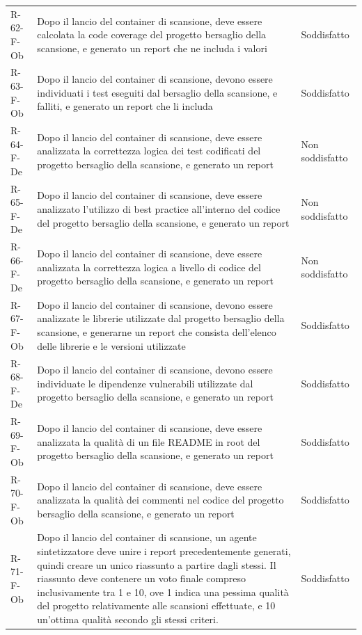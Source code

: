 \documentclass[a4paper, 11pt]{article}
\begin{document}
\begin{longtable}[c]{ >{\centering\arraybackslash}m{2.5cm} >{\centering\arraybackslash}m{8.3cm} >{\centering\arraybackslash}m{3.5cm} }
R-62-F-Ob & Dopo il lancio del container di scansione, deve essere calcolata la code coverage del progetto bersaglio della scansione, e generato un report che ne includa i valori & Soddisfatto\\
R-63-F-Ob & Dopo il lancio del container di scansione, devono essere individuati i test eseguiti dal bersaglio della scansione, e falliti, e generato un report che li includa & Soddisfatto\\
R-64-F-De & Dopo il lancio del container di scansione, deve essere analizzata la correttezza logica dei test codificati del progetto bersaglio della scansione, e generato un report & Non soddisfatto\\
R-65-F-De & Dopo il lancio del container di scansione, deve essere analizzato l'utilizzo di best practice all'interno del codice del progetto bersaglio della scansione, e generato un report & Non soddisfatto\\
R-66-F-De & Dopo il lancio del container di scansione, deve essere analizzata la correttezza logica a livello di codice del progetto bersaglio della scansione, e generato un report & Non soddisfatto\\
R-67-F-Ob & Dopo il lancio del container di scansione, devono essere analizzate le librerie utilizzate dal progetto bersaglio della scansione, e generarne un report che consista dell'elenco delle librerie e le versioni utilizzate & Soddisfatto\\
R-68-F-De & Dopo il lancio del container di scansione, devono essere individuate le dipendenze vulnerabili utilizzate dal progetto bersaglio della scansione, e generato un report & Soddisfatto\\
R-69-F-Ob & Dopo il lancio del container di scansione, deve essere analizzata la qualità di un file README in root del progetto bersaglio della scansione, e generato un report & Soddisfatto\\
R-70-F-Ob & Dopo il lancio del container di scansione, deve essere analizzata la qualità dei commenti nel codice del progetto bersaglio della scansione, e generato un report & Soddisfatto\\
R-71-F-Ob & Dopo il lancio del container di scansione, un agente sintetizzatore deve unire i report precedentemente generati, quindi creare un unico riassunto a partire dagli stessi. Il riassunto deve contenere un voto finale compreso inclusivamente tra 1 e 10, ove 1 indica una pessima qualità del progetto relativamente alle scansioni effettuate, e 10 un'ottima qualità secondo gli stessi criteri. & Soddisfatto\\

\end{longtable}
\end{document}
